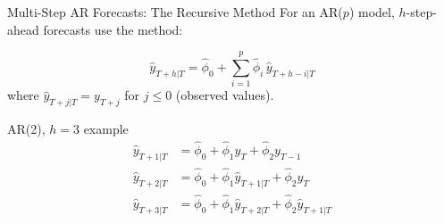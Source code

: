 \documentclass[aspectratio=169, 11pt]{beamer}
\begin{document}
\begin{frame}{Multi-Step AR Forecasts: The Recursive Method}
  For an AR($p$) model, $h$-step-ahead forecasts use the
   method:

  \vspace{0.1cm}
  \[
    \hat{y}_{T+h|T} = \hat{\phi}_0 + \sum_{i=1}^{p} \hat{\phi}_i\, \hat{y}_{T+h-i|T}
  \]
  where $\hat{y}_{T+j|T} = y_{T+j}$ for $j \leq 0$ (observed values).

  \vspace{0.15cm}
  \begin{examplebox}{AR(2), $h=3$ example}
    {\small
    \begin{align*}
      \hat{y}_{T+1|T} &= \hat{\phi}_0 + \hat{\phi}_1 y_T + \hat{\phi}_2 y_{T-1} \\
      \hat{y}_{T+2|T} &= \hat{\phi}_0 + \hat{\phi}_1 \hat{y}_{T+1|T} + \hat{\phi}_2 y_T \\
      \hat{y}_{T+3|T} &= \hat{\phi}_0 + \hat{\phi}_1 \hat{y}_{T+2|T} + \hat{\phi}_2 \hat{y}_{T+1|T}
    \end{align*}}
  \end{examplebox}
\end{frame}
\end{document}
